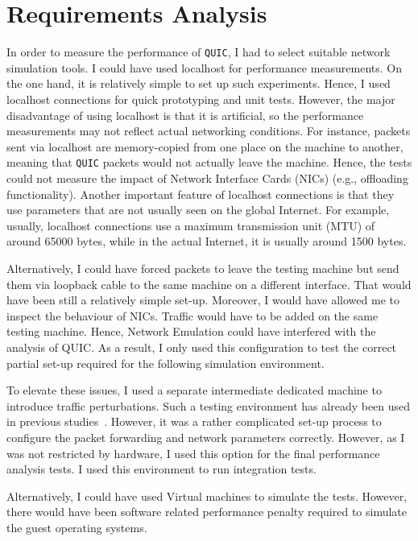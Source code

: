 \documentclass[12pt,a4paper,twoside,openright]{report}
\begin{document}
\section{Requirements Analysis}

In order to measure the performance of \texttt{QUIC}, I had to select suitable network simulation tools.
I could have used localhost for performance measurements.
On the one hand, it is relatively simple to set up such experiments.
Hence, I used localhost connections for quick prototyping and unit tests.
However, the major disadvantage of using localhost is that it is artificial, so the performance measurements may not reflect actual networking conditions.
For instance, packets sent via localhost are memory-copied from one place on the machine to another, meaning that \texttt{QUIC} packets would not actually leave the machine.
Hence, the tests could not measure the impact of Network Interface Cards (NICs) (e.g., offloading functionality).
Another important feature of localhost connections is that they use parameters that are not usually seen on the global Internet.
For example, usually, localhost connections use a maximum transmission unit (MTU) of around 65000 bytes, while in the actual Internet, it is usually around 1500 bytes.

 Alternatively, I could have forced packets to leave the testing machine but send them via loopback cable to the same machine on a different interface. 
 That would have been still a relatively simple set-up. 
 Moreover, I would have allowed me to inspect the behaviour of NICs.
 Traffic would have to be added on the same testing machine.
 Hence, Network Emulation could have interfered with the analysis of QUIC.
 As a result, I only used this configuration to test the correct partial set-up required for the following simulation environment.
 
 To elevate these issues, I used a separate intermediate dedicated machine to introduce traffic perturbations.
 Such a testing environment has already been used in previous studies~\cite{Making_QUIC_Quicker}.
 However, it was a rather complicated set-up process to configure the packet forwarding and network parameters correctly.
 However, as I was not restricted by hardware, I used this option for the final performance analysis tests.
 I used this environment to run integration tests.
 
 Alternatively, I could have used Virtual machines to simulate the tests.
 However, there would have been software related performance penalty required to simulate the guest operating systems.
 
\end{document}

